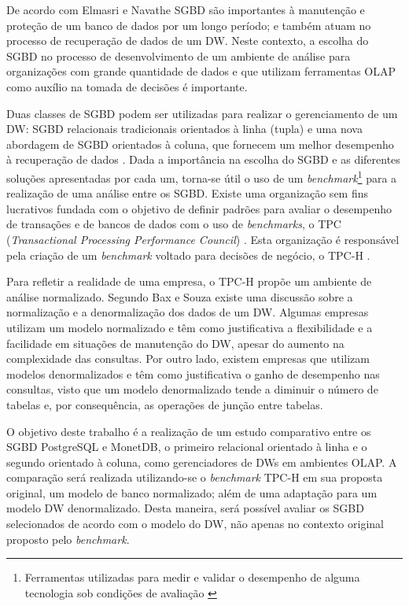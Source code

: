 De acordo com Elmasri e Navathe \cite{navathe2011banco} SGBD são importantes à manutenção 
e proteção de um banco de dados por um longo período; e também atuam no processo de recuperação de dados de um DW. Neste contexto, 
a escolha do SGBD no processo de desenvolvimento de um ambiente de análise para organizações com grande quantidade de dados e que utilizam ferramentas OLAP 
como auxílio na tomada de decisões é importante. 

Duas classes de SGBD podem ser utilizadas para realizar o gerenciamento de um DW: SGBD relacionais tradicionais orientados à linha (tupla) e uma nova abordagem de SGBD orientados à coluna, que fornecem um melhor desempenho à recuperação de dados \cite{good2017column}. 
Dada a importância na escolha do SGBD e as diferentes soluções apresentadas por cada um, torna-se útil o uso de um 
\textit{benchmark}\footnote{Ferramentas utilizadas para medir e validar o desempenho de alguma tecnologia sob condições de avaliação \cite{bouckaert2010benchmarking}} 
para a realização de uma análise entre os SGBD. Existe uma organização sem fins lucrativos fundada com o objetivo de definir padrões para avaliar o 
desempenho de transações e de bancos de dados com o uso de \textit{benchmarks}, o TPC (\textit{Transactional Processing Performance Council}) \cite{tpc2017page}. 
Esta organização é responsável pela criação de um \textit{benchmark} voltado para decisões de negócio, o TPC-H \cite{tpch2017page}.

Para refletir a realidade de uma empresa, o TPC-H propõe um ambiente de análise normalizado. Segundo Bax e Souza \cite{bax2003modelagem} 
existe uma discussão sobre a normalização e a denormalização dos dados de um DW. Algumas empresas utilizam um modelo normalizado e têm como 
justificativa a flexibilidade e a facilidade em situações de manutenção do DW, apesar do aumento na complexidade das consultas. Por outro lado, existem empresas que utilizam modelos denormalizados e têm como justificativa o ganho de desempenho nas consultas, visto que um modelo denormalizado tende a diminuir o número de tabelas e, por consequência, as operações de junção entre tabelas. 

O objetivo deste trabalho é a realização de um estudo comparativo entre os SGBD PostgreSQL e MonetDB, o primeiro relacional orientado à linha e o segundo orientado à coluna, 
como gerenciadores de DWs em ambientes OLAP. A comparação será realizada utilizando-se o \textit{benchmark} TPC-H em sua proposta original, um modelo de banco normalizado; 
além de uma adaptação para um modelo DW denormalizado. Desta maneira, será possível avaliar os SGBD selecionados de acordo com o modelo do DW, não apenas no 
contexto original proposto pelo \textit{benchmark}. 

